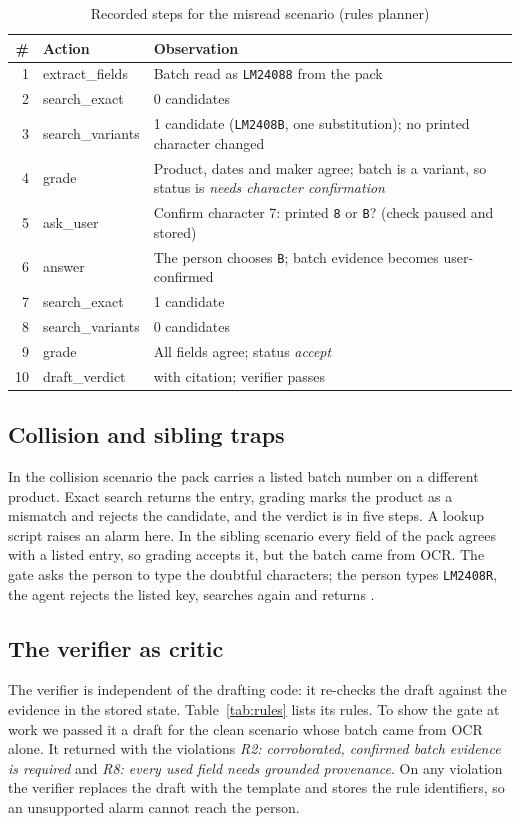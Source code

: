 \begin{table}[t]
\centering
\caption{Recorded steps for the misread scenario (rules planner)}
\label{tab:trace}
\scriptsize
\begin{tabularx}{\columnwidth}{@{}r >{\ttfamily}l X@{}}
\toprule
\# & \normalfont Action & Observation \\
\midrule
1 & extract\_fields & Batch read as \texttt{LM24088} from the pack \\
2 & search\_exact & 0 candidates \\
3 & search\_variants & 1 candidate (\texttt{LM2408B}, one substitution); no printed character changed \\
4 & grade & Product, dates and maker agree; batch is a variant, so status is \emph{needs character confirmation} \\
5 & ask\_user & Confirm character 7: printed \texttt{8} or \texttt{B}? (check paused and stored) \\
6 & answer & The person chooses \texttt{B}; batch evidence becomes user-confirmed \\
7 & search\_exact & 1 candidate \\
8 & search\_variants & 0 candidates \\
9 & grade & All fields agree; status \emph{accept} \\
10 & draft\_verdict & \FLAGGED{} with citation; verifier passes \\
\bottomrule
\end{tabularx}
\end{table}

\subsection{Collision and sibling traps}
In the collision scenario the pack carries a listed batch number on a different product. Exact search returns the entry, grading marks the product as a mismatch and rejects the candidate, and the verdict is \NLISTED{} in five steps. A lookup script raises an alarm here. In the sibling scenario every field of the pack agrees with a listed entry, so grading accepts it, but the batch came from OCR. The gate asks the person to type the doubtful characters; the person types \texttt{LM2408R}, the agent rejects the listed key, searches again and returns \NLISTED.

\subsection{The verifier as critic}
The verifier is independent of the drafting code: it re-checks the draft against the evidence in the stored state. Table~\ref{tab:rules} lists its rules. To show the gate at work we passed it a \FLAGGED{} draft for the clean scenario whose batch came from OCR alone. It returned \CANTV{} with the violations \emph{R2: corroborated, confirmed batch evidence is required} and \emph{R8: every used field needs grounded provenance}. On any violation the verifier replaces the draft with the \CANTV{} template and stores the rule identifiers, so an unsupported alarm cannot reach the person.

